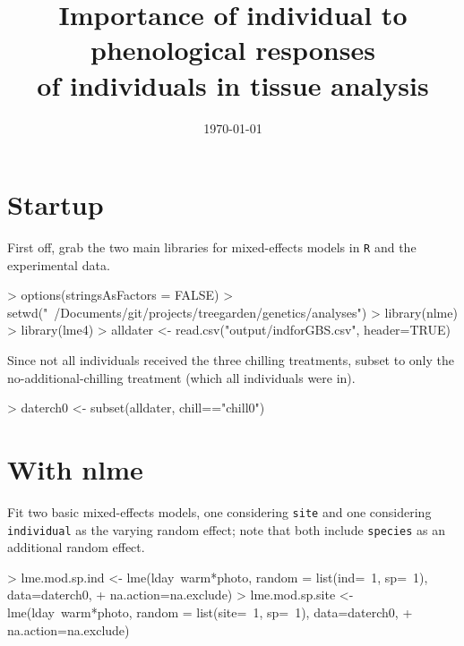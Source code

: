 \documentclass{article}
\begin{document}
\title{Importance of individual to phenological responses \\ of individuals in tissue analysis}
\date{\today}
\maketitle 

\section{Startup}

First off, grab the two main libraries for mixed-effects models in \verb|R| and the experimental data.
\begin{Schunk}
\begin{Sinput}
> options(stringsAsFactors = FALSE)
> setwd("~/Documents/git/projects/treegarden/genetics/analyses")
> library(nlme)
> library(lme4)
> alldater <- read.csv("output/indforGBS.csv", header=TRUE)
\end{Sinput}
\end{Schunk}

Since not all individuals received the three chilling treatments, subset to only the no-additional-chilling treatment (which all individuals were in). 
\begin{Schunk}
\begin{Sinput}
> daterch0 <- subset(alldater, chill=="chill0")
\end{Sinput}
\end{Schunk}

\section{With nlme}

Fit two basic mixed-effects models, one considering \verb|site| and one considering \verb|individual| as the varying random effect; note that both include \verb|species| as an additional random effect. 
\begin{Schunk}
\begin{Sinput}
> lme.mod.sp.ind <- lme(lday~warm*photo, random = list(ind=~1, sp=~1), data=daterch0, 
+     na.action=na.exclude)
> lme.mod.sp.site <- lme(lday~warm*photo, random = list(site=~1, sp=~1), data=daterch0, 
+     na.action=na.exclude)
\end{Sinput}
\end{Schunk}
\end{document}
